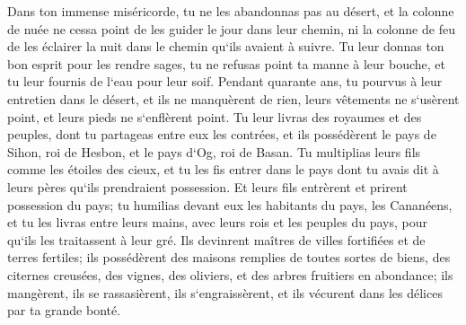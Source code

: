 \verse Dans ton immense miséricorde, tu ne les abandonnas pas au désert, et la colonne de nuée ne cessa point de les guider le jour dans leur chemin, ni la colonne de feu de les éclairer la nuit dans le chemin qu`ils avaient à suivre. 
\verse Tu leur donnas ton bon esprit pour les rendre sages, tu ne refusas point ta manne à leur bouche, et tu leur fournis de l`eau pour leur soif. 
\verse Pendant quarante ans, tu pourvus à leur entretien dans le désert, et ils ne manquèrent de rien, leurs vêtements ne s`usèrent point, et leurs pieds ne s`enflèrent point. 
\verse Tu leur livras des royaumes et des peuples, dont tu partageas entre eux les contrées, et ils possédèrent le pays de Sihon, roi de Hesbon, et le pays d`Og, roi de Basan. 
\verse Tu multiplias leurs fils comme les étoiles des cieux, et tu les fis entrer dans le pays dont tu avais dit à leurs pères qu`ils prendraient possession. 
\verse Et leurs fils entrèrent et prirent possession du pays; tu humilias devant eux les habitants du pays, les Cananéens, et tu les livras entre leurs mains, avec leurs rois et les peuples du pays, pour qu`ils les traitassent à leur gré. 
\verse Ils devinrent maîtres de villes fortifiées et de terres fertiles; ils possédèrent des maisons remplies de toutes sortes de biens, des citernes creusées, des vignes, des oliviers, et des arbres fruitiers en abondance; ils mangèrent, ils se rassasièrent, ils s`engraissèrent, et ils vécurent dans les délices par ta grande bonté. 
